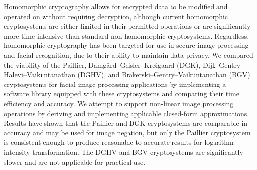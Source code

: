 \begin{thesisabstract}
    \noindent
    Homomorphic cryptography allows for encrypted data to be modified and operated on without requiring decryption, although current homomorphic cryptosystems are either limited in their permitted operations or are significantly more time-intensive than standard non-homomorphic cryptosystems. Regardless, homomorphic cryptography has been targeted for use in secure image processing and facial recognition, due to their ability to maintain data privacy. We compared the viability of the Paillier, Damg{\aa}rd--Geisler--Kr{\o}igaard (DGK), Dijk--Gentry--Halevi--Vaikuntanathan (DGHV), and Brakerski--Gentry--Vaikuntanathan (BGV) cryptosystems for facial image processing applications by implementing a software library equipped with these cryptosystems and comparing their time efficiency and accuracy. We attempt to support non-linear image processing operations by deriving and implementing applicable closed-form approximations. Results have shown that the Paillier and DGK cryptosystems are comparable in accuracy and may be used for image negation, but only the Paillier cryptosystem is consistent enough to produce reasonable to accurate results for logarithm intensity transformation. The DGHV and BGV cryptosystems are significantly slower and are not applicable for practical use.

\end{thesisabstract}
